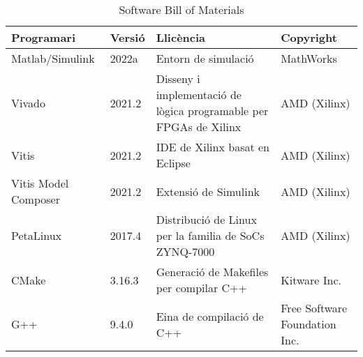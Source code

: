 \begin{table}[!htb]
    \caption{ Software Bill of Materials  }
    \label{sbom}

    \begin{tabular}{l l m{6.4cm} m{3cm}}
        \toprule
            \textbf{Programari} & 
            \textbf{Versió} & 
            \textbf{Llicència} & 
            \textbf{Copyright} \\
        \midrule
            Matlab/Simulink & 
            2022a & 
            Entorn de simulació & 
            MathWorks \\

            Vivado &
            2021.2 &
            Disseny i implementació de lògica programable per FPGAs de Xilinx &
            AMD (Xilinx) \\

            Vitis &
            2021.2 &
            IDE de Xilinx basat en Eclipse &
            AMD (Xilinx) \\

            Vitis Model Composer & 
            2021.2 & 
            Extensió de Simulink & 
            AMD (Xilinx) \\ 

            PetaLinux & 
            2017.4 & 
            Distribució de Linux per la familia de SoCs ZYNQ-7000 & 
            AMD (Xilinx) \\ 

            CMake & 
            3.16.3 & 
            Generació de Makefiles per compilar C++ & 
            Kitware Inc. \\ 

            G++ & 
            9.4.0 & 
            Eina de compilació de C++ & 
            Free Software Foundation Inc. \\ 

        \bottomrule
    \end{tabular}
\end{table}